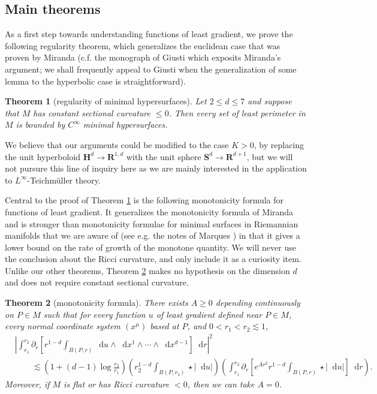 \documentclass[reqno,10pt]{amsart}
\newcommand{\RR}{\mathbf{R}}
\newcommand{\Hyp}{\mathbf H}
\newcommand{\Sph}{\mathbf S}
\newcommand*\dif{\mathop{}\!\mathrm{d}}
\newtheorem{theorem}{Theorem}[section]
\theoremstyle{definition}
\numberwithin{equation}{section}
\begin{document}

\subsection{Main theorems}
As a first step towards understanding functions of least gradient, we prove the following regularity theorem, which generalizes the euclidean case that was proven by Miranda \cite{Miranda64, Miranda66, Miranda67} (c.f. the monograph of Giusti \cite{Giusti77} which exposits Miranda's argument; we shall frequently appeal to Giusti when the generalization of some lemma to the hyperbolic case is straightforward).

\begin{theorem}[regularity of minimal hypersurfaces]\label{main lma}
Let $2 \leq d \leq 7$ and suppose that $M$ has constant sectional curvature $\leq 0$.
Then every set of least perimeter in $M$ is bounded by $C^\infty$ minimal hypersurfaces.
\end{theorem}

We believe that our arguments could be modified to the case $K > 0$, by replacing the unit hyperboloid $\Hyp^d \to \RR^{1, d}$ with the unit sphere $\Sph^d \to \RR^{d + 1}$, but we will not pursure this line of inquiry here as we are mainly interested in the application to $L^\infty$-Teichm\"uller theory.

Central to the proof of Theorem \ref{main lma} is the following monotonicity formula for functions of least gradient. It generalizes the monotonicity formula of Miranda \cite[Theorem 2.8]{Miranda66} and is stronger than monotonicity formulae for minimal surfaces in Riemannian manifolds that we are aware of (see e.g. the notes of Marques \cite[\S7]{MarquesXX}) in that it gives a lower bound on the rate of growth of the monotone quantity. We will never use the conclusion about the Ricci curvature, and only include it as a curiosity item.
Unlike our other theorems, Theorem \ref{monotonicity prestate} makes no hypothesis on the dimension $d$ and does not require constant sectional curvature.

\begin{theorem}[monotonicity formula]\label{monotonicity prestate}
There exists $A \geq 0$ depending continuously on $P \in M$ such that for every function $u$ of least gradient defined near $P \in M$, every normal coordinate system $(x^\mu)$ based at $P$, and $0 < r_1 < r_2 \lesssim 1$,
\begin{align*}
&\left|\int_{r_1}^{r_2} \partial_r \left[r^{1 - d} \int_{B(P, r)} \dif u \wedge \dif x^1 \wedge \cdots \wedge \dif x^{d - 1}\right] \dif r\right|^2 \\
&\qquad \lesssim \left(1 + (d - 1) \log \frac{r_2}{r_1}\right) \left(r_2^{1 - d}\int_{B(P, r_2)} \star |\dif u| \right)\left(\int_{r_1}^{r_2} \partial_r \left[e^{Ar^2} r^{1 - d} \int_{B(P, r)} \star |\dif u|\right] \dif r\right).
\end{align*}
Moreover, if $M$ is flat or has Ricci curvature $< 0$, then we can take $A = 0$.
\end{theorem}
\end{document}

